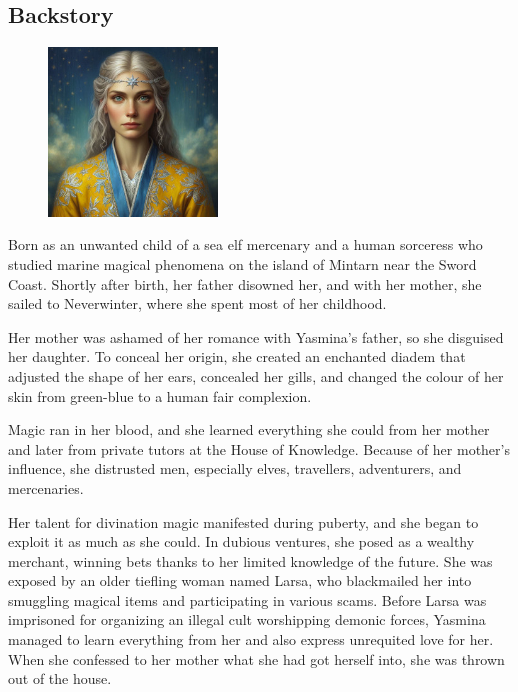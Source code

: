 \documentclass[10pt,onecolumn,twoside,openany,bg=full,layout=true]{dndbook}
\begin{document}
\subsection{Backstory}\label{subsec:yasmina-backstory}
\begin{figure}
  \begin{center}
    \includegraphics[width=0.4\textwidth]{img/characters/yasmina}
  \end{center}
\end{figure}
Born as an unwanted child of a sea elf mercenary and a human sorceress who studied marine magical phenomena on the
island of Mintarn near the Sword Coast.
Shortly after birth, her father disowned her, and with her mother, she sailed
to Neverwinter, where she spent most of her childhood.

Her mother was ashamed of her romance with Yasmina's father, so she disguised her daughter.
To conceal her origin, she created an enchanted diadem that adjusted the shape of her ears, concealed her gills,
and changed the colour of her skin from green-blue to a human fair complexion.

Magic ran in her blood, and she learned everything she could from her mother and later from private tutors at the
House of Knowledge.
Because of her mother's influence, she distrusted men, especially elves, travellers, adventurers, and mercenaries.

Her talent for divination magic manifested during puberty, and she began to exploit it as much as she could.
In dubious ventures, she posed as a wealthy merchant, winning bets thanks to her limited knowledge of the future.
She was exposed by an older tiefling woman named Larsa, who blackmailed her into smuggling magical items and
participating in various scams.
Before Larsa was imprisoned for organizing an illegal cult worshipping demonic forces, Yasmina managed to learn
everything from her and also express unrequited love for her.
When she confessed to her mother what she had got herself into, she was thrown out of the house.
\end{document}

